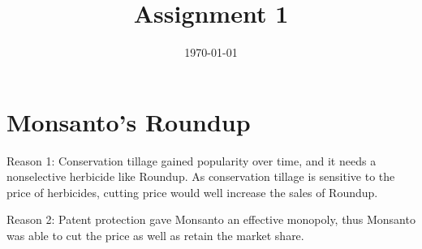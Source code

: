 \documentclass[a4paper]{article}
\date{\today}
\title{Assignment 1}
\newcommand{\T}{\top}
\newcommand{\expdist}[2]{%
        \normalfont{\textsc{Exp}}(#1, #2)%
    }
\newcommand{\expparam}{\bm \lambda}
\newcommand{\natparam}{\bm \eta}
\newcommand{\sufstat}{\bm u}
\begin{document}
    \header{}



    
    \section{Monsanto's Roundup}
    \begin{answer}[Q1]
    Reason 1: Conservation tillage gained popularity over time, and it needs a nonselective herbicide like Roundup. As conservation tillage is sensitive to the price of herbicides, cutting price would well increase the sales of Roundup.
    
    Reason 2: Patent protection gave Monsanto an effective monopoly, thus Monsanto was able to cut the price as well as retain the market share. 
    \end{answer}
    
\end{document}
